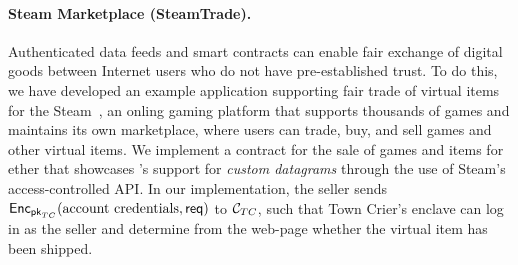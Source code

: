 

\paragraph{Steam Marketplace ({\sf SteamTrade}).} 
Authenticated data feeds and smart contracts can enable
fair exchange of digital goods 
between Internet users who do not have pre-established trust.
To do this, we have developed an example application supporting
fair trade of virtual items for the Steam~\cite{steam},
an onling gaming platform that supports thousands of games and maintains its own marketplace, where users can trade, buy, and sell games and other virtual items.  
We implement a contract for the sale of games and items for ether that showcases \tc's support for {\it custom datagrams} through the use of Steam's access-controlled API.
In our implementation, 
the seller sends ${\sf Enc}_{{\sf pk}_{TC}}(\text{account credentials}, {\sf req})$
to ${\cal C}_{TC}$,
such that Town Crier's enclave can log in as the seller  
and determine from the web-page whether the virtual item
has been shipped.


